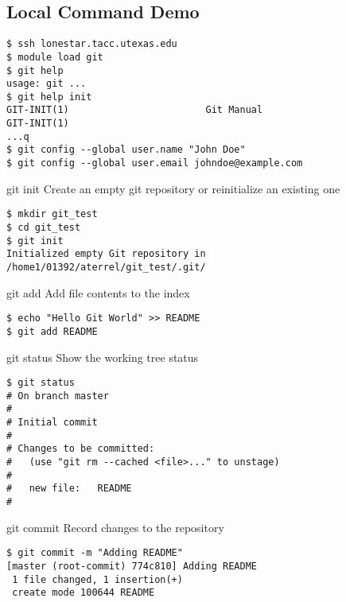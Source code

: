 \subsection{Local Command Demo}

\begin{frame}[fragile]
\begin{verbatim}
$ ssh lonestar.tacc.utexas.edu
$ module load git
$ git help
usage: git ...
$ git help init
GIT-INIT(1)                        Git Manual                       GIT-INIT(1)
...q
$ git config --global user.name "John Doe"
$ git config --global user.email johndoe@example.com
\end{verbatim}
\end{frame}
\begin{frame}[fragile]
\begin{block}{git init}
Create an empty git repository or reinitialize an existing one
\end{block}
\begin{verbatim}
$ mkdir git_test
$ cd git_test
$ git init
Initialized empty Git repository in
/home1/01392/aterrel/git_test/.git/
\end{verbatim}
\end{frame}

\begin{frame}[fragile]
\begin{block}{git add}
Add file contents to the index
\end{block}
\begin{verbatim}
$ echo "Hello Git World" >> README
$ git add README
\end{verbatim}
\end{frame}

\begin{frame}[fragile]
\begin{block}{git status}
Show the working tree status
\end{block}
\begin{verbatim}
$ git status
# On branch master
#
# Initial commit
#
# Changes to be committed:
#   (use "git rm --cached <file>..." to unstage)
#
#	new file:   README
#
\end{verbatim}
\end{frame}

\begin{frame}[fragile]
\begin{block}{git commit}
Record changes to the repository
\end{block}
\begin{verbatim}
$ git commit -m "Adding README"
[master (root-commit) 774c810] Adding README
 1 file changed, 1 insertion(+)
 create mode 100644 README
\end{verbatim}
\end{frame}

